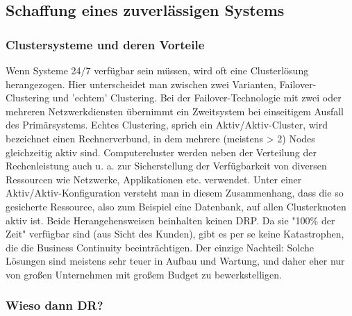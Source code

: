 \documentclass[letterpaper, 12pt]{article}
\let\tempsubsection\subsection
\renewcommand\subsection[1]{\vspace{0cm}\tempsubsection{#1}\vspace{0cm}}
\let\tempsubsubsection\subsubsection
\renewcommand\subsubsection[1]{\vspace{0cm}\tempsubsubsection{#1}\vspace{0cm}}
\begin{document}
\subsection{Schaffung eines zuverlässigen Systems \cite{bookthree}}

\subsubsection{Clustersysteme und deren Vorteile}

Wenn Systeme 24/7 verfügbar sein müssen, wird oft eine Clusterlösung herangezogen. Hier unterscheidet man zwischen zwei Varianten, Failover-Clustering und 'echtem' Clustering. Bei der Failover-Technologie mit zwei oder mehreren Netzwerkdiensten übernimmt ein Zweitsystem bei einseitigem Ausfall des Primärsystems. Echtes Clustering, sprich ein Aktiv/Aktiv-Cluster, wird bezeichnet einen Rechnerverbund, in dem mehrere (meistens > 2) Nodes gleichzeitig aktiv sind. Computercluster werden neben der Verteilung der Rechenleistung auch u. a. zur Sicherstellung der Verfügbarkeit von diversen Ressourcen wie Netzwerke, Applikationen etc. verwendet. Unter einer Aktiv/Aktiv-Konfiguration versteht man in diesem Zusammenhang, dass die so gesicherte Ressource, also zum Beispiel eine Datenbank, auf allen Clusterknoten aktiv ist. Beide Herangehensweisen beinhalten keinen DRP. Da sie "100\% der Zeit" verfügbar sind (aus Sicht des Kunden), gibt es per se keine Katastrophen, die die Business Continuity beeinträchtigen. Der einzige Nachteil: Solche Lösungen sind meistens sehr teuer in Aufbau und Wartung, und daher eher nur von großen Unternehmen mit großem Budget zu bewerkstelligen.

\subsubsection{Wieso dann DR?}
\end{document}

